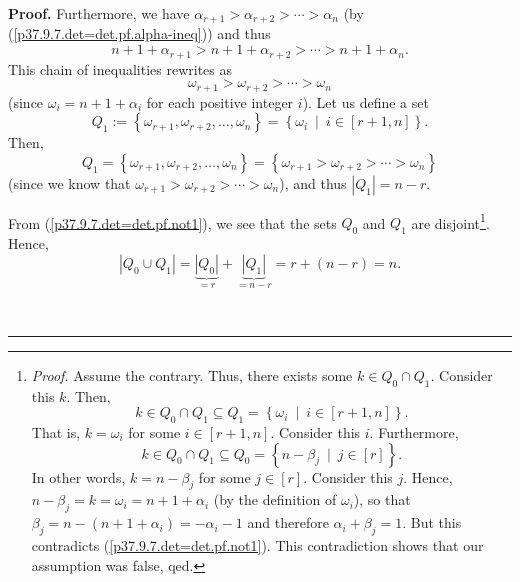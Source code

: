 \documentclass[numbers=enddot,12pt,final,onecolumn,notitlepage]{scrartcl}%
\theoremstyle{definition}
\newenvironment{proof}[1][Proof]{\noindent\textbf{#1.} }{\ \rule{0.5em}{0.5em}}
\begin{document}
\begin{enumerate}
\begin{proof}
Furthermore, we have $\alpha_{r+1}>\alpha_{r+2}>\cdots>\alpha_{n}$ (by
(\ref{p37.9.7.det=det.pf.alpha-ineq})) and thus%
\[
n+1+\alpha_{r+1}>n+1+\alpha_{r+2}>\cdots>n+1+\alpha_{n}.
\]
This chain of inequalities rewrites as%
\[
\omega_{r+1}>\omega_{r+2}>\cdots>\omega_{n}%
\]
(since $\omega_{i}=n+1+\alpha_{i}$ for each positive integer $i$). Let us
define a set%
\[
Q_{1}:=\left\{  \omega_{r+1},\omega_{r+2},\ldots,\omega_{n}\right\}  =\left\{
\omega_{i}\ \mid\ i\in\left[  r+1,n\right]  \right\}  .
\]
Then,
\[
Q_{1}=\left\{  \omega_{r+1},\omega_{r+2},\ldots,\omega_{n}\right\}  =\left\{
\omega_{r+1}>\omega_{r+2}>\cdots>\omega_{n}\right\}
\]
(since we know that $\omega_{r+1}>\omega_{r+2}>\cdots>\omega_{n}$), and thus
$\left\vert Q_{1}\right\vert =n-r$.

From (\ref{p37.9.7.det=det.pf.not1}), we see that the sets $Q_{0}$ and $Q_{1}$
are disjoint\footnote{\textit{Proof.} Assume the contrary. Thus, there exists
some $k\in Q_{0}\cap Q_{1}$. Consider this $k$. Then,%
\[
k\in Q_{0}\cap Q_{1}\subseteq Q_{1}=\left\{  \omega_{i}\ \mid\ i\in\left[
r+1,n\right]  \right\}  .
\]
That is, $k=\omega_{i}$ for some $i\in\left[  r+1,n\right]  $. Consider this
$i$. Furthermore,%
\[
k\in Q_{0}\cap Q_{1}\subseteq Q_{0}=\left\{  n-\beta_{j}\ \mid\ j\in\left[
r\right]  \right\}  .
\]
In other words, $k=n-\beta_{j}$ for some $j\in\left[  r\right]  $. Consider
this $j$. Hence, $n-\beta_{j}=k=\omega_{i}=n+1+\alpha_{i}$ (by the definition
of $\omega_{i}$), so that $\beta_{j}=n-\left(  n+1+\alpha_{i}\right)
=-\alpha_{i}-1$ and therefore $\alpha_{i}+\beta_{j}=1$. But this contradicts
(\ref{p37.9.7.det=det.pf.not1}). This contradiction shows that our assumption
was false, qed.}. Hence,
\[
\left\vert Q_{0}\cup Q_{1}\right\vert =\underbrace{\left\vert Q_{0}\right\vert
}_{=r}+\underbrace{\left\vert Q_{1}\right\vert }_{=n-r}=r+\left(  n-r\right)
=n.
\]



\end{proof}
\end{enumerate}
\end{document}
